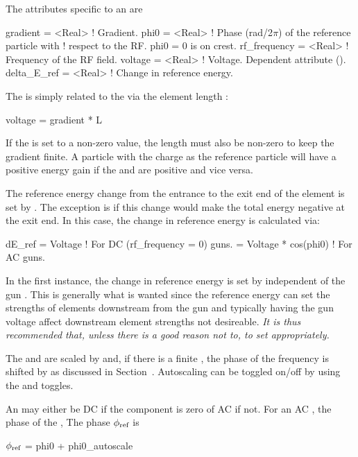 The attributes specific to an  are 
\begin{example}
  gradient     = <Real>    ! Gradient.
  phi0         = <Real>    ! Phase (rad/2\(\pi\)) of the reference particle with 
                           !   respect to the RF. phi0 = 0 is on crest.
  rf_frequency = <Real>    ! Frequency of the RF field.
  voltage      = <Real>    ! Voltage. Dependent attribute (). 
  delta_E_ref  = <Real>    ! Change in reference energy.
\end{example}

The  is simply related to the  via the element length :
\begin{example}
  voltage = gradient * L
\end{example}
If the  is set to a non-zero value, the length  must also be non-zero to keep the
gradient finite.  A particle with the charge as the reference particle will have a positive energy
gain if the  and  are positive and vice versa.

The reference energy change from the entrance to the exit end of the element is set by . 
The exception is if this change would make the total energy negative at the exit end. In this case,
the change in reference energy is calculated via:
\begin{example}
  dE_ref = Voltage              ! For DC (rf_frequency = 0) guns.
         = Voltage * cos(phi0)  ! For AC guns.
\end{example}
In the first instance, the change in reference energy is set by  independent of the
gun . This is generally what is wanted since the reference energy can set the strengths
of elements downstream from the gun and typically having the gun voltage affect downstream element
strengths not desireable. {\em It is thus recommended that, unless there is a good reason not to, to
set  appropriately.}

The  and  are scaled by  and, if there is a
finite , the phase of the frequency is shifted by  as
discussed in Section~. Autoscaling can be toggled on/off by using the
 and  toggles.

An  may either be DC if the  component is zero of AC if
not. For an AC , the phase of the , The phase $\phi_{\text{ref}}$
is 
\begin{example} 
  \(\phi_{\text{ref}}\) = phi0 + phi0_autoscale 
\end{example}

